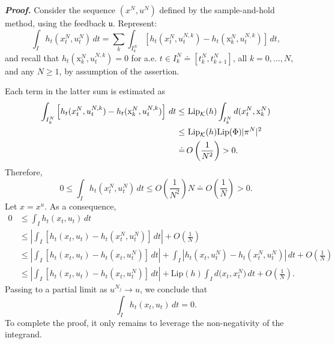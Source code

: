 \documentclass[sn-mathphys-num]{sn-jnl}
\numberwithin{equation}{section}
\theoremstyle{mythm}
\theoremstyle{mydef}
\renewenvironment{proof}{\smallskip\noindent\emph{\textbf{Proof.}}%
  \hspace{1pt}}{\hspace{-5pt}{\nobreak\quad\nobreak\hfill\nobreak%
    $\square$\vspace{2pt}\par}\smallskip\goodbreak}
\newcommand{\Lip}{\mathrm{Lip}}
\renewcommand{\d}{\,d}
\begin{document}
\begin{proof}
     Consider the sequence $(x^N, u^N)$ defined by the sample-and-hold method, using the feedback $\mathfrak u$. Represent:
    \[
      \int_I h_t(x^N_t, u^N_t) \d t = \sum_k \int_{{I_k^N}}\left[h_t(x^N_t, u^{N,k}_t) - h_{t}({\mathrm x}^N_{k}, u^{N,k}_t)\right]\d t, 
    \]
    and recall that      \(h_{t}({\mathrm x}^N_{k}, u^{N,k}_t) = 0\) for a.e. $t \in {I_k^N} \doteq [t_k^N, t_{k+1}^N]$, all $k = 0, \ldots, N$, and any $N \geq 1$, by assumption of the assertion.  

 Each term in the latter sum is estimated as
    \begin{align*}
                \int_{{I_k^N}}\left[h_t(x^N_t, u^{N,k}_t) - h_{t}(\mathrm x^N_{k}, u^{N,k}_t)\right]\d t \leq & \ \Lip_{\mathcal K}(h) \int_{{I_k^N}}d(x^N_t,\mathrm x^N_{k})\notag\\ 
                \leq & \  \Lip_{\mathcal K}(h) \Lip(\Phi) |\pi^N|^2\notag\\ 
                \doteq & \,  O\left(\frac{1}{N^2}\right)>0.
    \end{align*}
    Therefore,
\[
        0\leq \int_I h_t(x^N_t, u^N_t) \d t \leq O\left(\frac{1}{N^2}\right) N \doteq  O\left(\frac{1}{N}\right)>0.
    \]
    Let $x=x^{u}$. As a consequence,
    \begin{align*}
    0 & \leq 
        \int_I h_t(x_t, u_t)\d t\\ 
        & \leq  \left|\int_I \left[h_t(x_t, u_t) - h_t(x^N_t, u^N_t)\right] \d t\right|+ O\left(\frac{1}{N}\right)\\ 
              & \leq \left|\int_I \left[h_t(x_t, u_t) - h_t(x_t, u^N_t)\right] \d t\right| + \int_I \left|h_t(x_t, u_t^N) - h_t(x^N_t, u^N_t)\right| \d t+ O\left(\frac{1}{N}\right)\\
              & \leq \left|\int_I \left[h_t(x_t, u_t) - h_t(x_t, u^N_t)\right] \d t\right| + \Lip(h)\int_I d\big(x_t, x^N_t\big)\d t+ O\left(\frac{1}{N}\right).
    \end{align*}
    Passing to a partial limit as $u^{N_j} \to u$,
    we conclude that
    \[
      \int_I h_t(x_t, u_t)\d t =  0.
    \]
  To complete the proof, it only remains to leverage the non-negativity of the integrand.
  
\end{proof}
\end{document}
